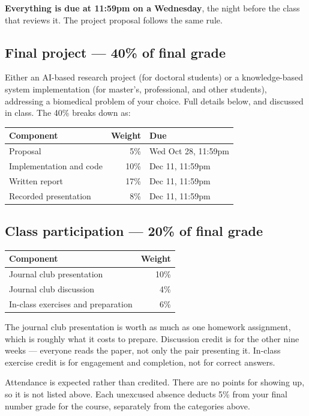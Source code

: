 \documentclass[11pt]{article}
\begin{document}
\textbf{Everything is due at 11:59pm on a Wednesday}, the night before the class that reviews
it. The project proposal follows the same rule.

\subsection{Final project --- 40\% of final grade}

Either an AI-based research project (for doctoral students) or a knowledge-based system
implementation (for master's, professional, and other students), addressing a biomedical problem
of your choice. Full details below, and discussed in class. The 40\% breaks down as:

\begin{tabular}{@{}lrl@{}}
  \toprule
  \textbf{Component} & \textbf{Weight} & \textbf{Due} \\
  \midrule
  Proposal & 5\% & Wed Oct 28, 11:59pm \\
  Implementation and code & 10\% & Dec 11, 11:59pm \\
  Written report & 17\% & Dec 11, 11:59pm \\
  Recorded presentation & 8\% & Dec 11, 11:59pm \\
  \bottomrule
\end{tabular}

\subsection{Class participation --- 20\% of final grade}

\begin{tabular}{@{}lr@{}}
  \toprule
  \textbf{Component} & \textbf{Weight} \\
  \midrule
  Journal club presentation & 10\% \\
  Journal club discussion & 4\% \\
  In-class exercises and preparation & 6\% \\
  \bottomrule
\end{tabular}

The journal club presentation is worth as much as one homework assignment, which is roughly what
it costs to prepare. Discussion credit is for the other nine weeks --- everyone reads the paper,
not only the pair presenting it. In-class exercise credit is for engagement and completion, not
for correct answers.

Attendance is expected rather than credited. There are no points for showing up, so it is not
listed above. Each unexcused absence deducts 5\% from your final number grade for the course,
separately from the categories above.
\end{document}
